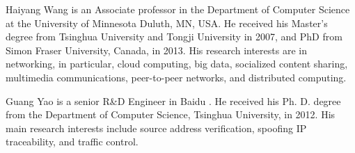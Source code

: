 \documentclass[10pt,journal,compsoc]{IEEEtran}
\begin{document}
\begin{IEEEbiography}
{Haiyang Wang} is an Associate professor in the Department of Computer Science at the University of Minnesota Duluth, MN, USA. He received his Master's degree from Tsinghua University and Tongji University in 2007, and PhD from Simon Fraser University, Canada, in 2013. His research interests are in networking, in particular, cloud computing, big data, socialized content sharing, multimedia communications, peer-to-peer networks, and distributed computing.
\end{IEEEbiography}

\begin{IEEEbiography}
{Guang Yao} is a senior R\&D Engineer in Baidu . He received his Ph. D. degree from the Department of Computer Science, Tsinghua University, in 2012. His main research interests include source address verification, spoofing IP traceability, and traffic control.
\end{IEEEbiography}

\end{document}
